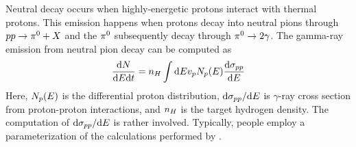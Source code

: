 Neutral \pion decay occurs when highly-energetic protons interact with
thermal protons. This emission happens when protons decay into neutral
pions through $pp \rightarrow {\pi}^0 + X$ and the ${\pi}^0$ subsequently
decay through ${\pi}^0 \rightarrow 2\gamma$.  The gamma-ray emission
from neutral pion decay can be computed as
\begin{equation}
  \frac{\text{d}N}{\text{d}E\text{d}t} = 
  n_H \int \text{d}E v_p N_p(E) 
  \frac{\text{d}\sigma_{pp}}{\text{d}E}
\end{equation}
Here, $N_p(E)$
is the differential proton distribution,
$\text{d}\sigma_{pp}/\text{d}E$ is
$\gamma$-ray cross section from proton-proton interactions, and
$n_H$ is the target hydrogen density.  The computation
of $\text{d}\sigma_{pp}/\text{d}E$
is rather involved. Typically, people employ a parameterization
of the calculations performed by
\cite{kamae_2006a_parameterization-gamma}.
